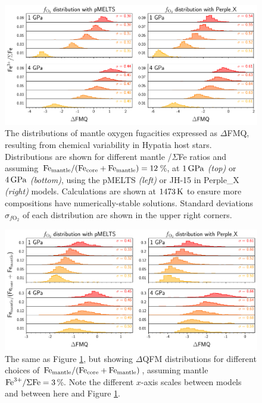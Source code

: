 \documentclass[fleqn,usenatbib,twocolumn]{mnras}
\newcommand{\todo}[1]{\textit{\textcolor{violet}{{#1}}}}
\begin{document}


\begin{figure}
\centering
  \includegraphics[width=\textwidth]{figs/hist_X_ferric.pdf}
\caption{The distributions of mantle oxygen fugacities expressed as $\Delta$FMQ, resulting from chemical variability in Hypatia host stars. Distributions are shown for different mantle /$\Sigma$Fe ratios and assuming ${\rm Fe}_{\rm mantle}/({\rm Fe}_{\rm core} + {\rm Fe}_{\rm mantle}) = 12$\%, at $1\,{\rm GPa}$ \textit{(top)} or $4\,{\rm GPa}$ \textit{(bottom)}, using the pMELTS \textit{(left)} or JH-15 in Perple\_X \textit{(right)} models. Calculations are shown at $1473\,{\rm K}$ to ensure more compositions have numerically-stable solutions. Standard deviations $\sigma_{f\text{O}_2}$ of each distribution are shown in the upper right corners.\label{fig:hist_fe}}
\end{figure}



\begin{figure}
\centering
  \includegraphics[width=\textwidth]{figs/hist_core_eff.pdf}
\caption{The same as Figure \ref{fig:hist_fe}, but showing $\Delta$QFM distributions for different choices of ${\rm Fe}_{\rm mantle}/({\rm Fe}_{\rm core} + {\rm Fe}_{\rm mantle})$, assuming mantle ${\rm Fe}^{3+}/\Sigma{\rm Fe} = 3$\%. Note the different $x$-axis scales between models and between here and Figure \ref{fig:hist_fe}.\label{fig:hist_core}}
\end{figure}
\end{document}
